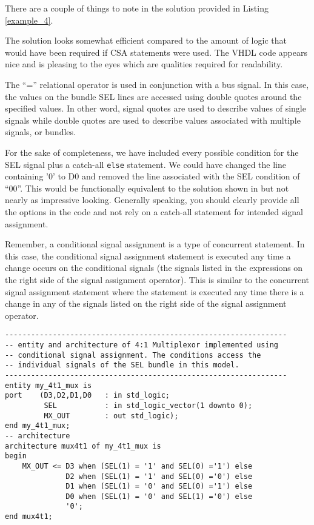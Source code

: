 There are a couple of things to note in the solution provided in Listing \ref{example_4}.
\begin{my_list}
\item The solution looks somewhat efficient compared to the amount of logic that would have been required if CSA statements were used. The VHDL code appears nice and is pleasing to the eyes which are qualities required for readability.
\item The ``='' relational operator is used in conjunction with a bus signal. In this case, the values on the bundle SEL lines are accessed using double quotes around the specified values. In other word, signal quotes are used to describe values of single signals while double quotes are used to describe values associated with multiple signals, or bundles.
\item For the sake of completeness, we have included every possible condition for the SEL signal plus a catch-all \texttt{else} statement. We could have changed the line containing '0' to D0 and removed the line associated with the SEL condition of ``00''. This would be functionally equivalent to the solution shown in but not nearly as impressive looking. Generally speaking, you should clearly provide all the options in the code and not rely on a catch-all statement for intended signal assignment.
\end{my_list}
Remember, a conditional signal assignment is a type of concurrent statement. In this case, the conditional signal assignment statement is executed any time a change occurs on the conditional signals (the signals listed in the expressions on the right side of the signal assignment operator). This is similar to the concurrent signal assignment statement where the statement is executed any time there is a change in any of the signals listed on the right side of the signal assignment operator.

\begin{lstlisting}[label=example_4_bis, caption=Alternative solution to example 4 accessing individual signals.]
-----------------------------------------------------------------
-- entity and architecture of 4:1 Multiplexor implemented using
-- conditional signal assignment. The conditions access the
-- individual signals of the SEL bundle in this model.
-----------------------------------------------------------------
entity my_4t1_mux is
port	(D3,D2,D1,D0   : in std_logic;
         SEL           : in std_logic_vector(1 downto 0);
         MX_OUT        : out std_logic);
end my_4t1_mux;
-- architecture
architecture mux4t1 of my_4t1_mux is
begin
	MX_OUT <= D3 when (SEL(1) = '1' and SEL(0) ='1') else
	          D2 when (SEL(1) = '1' and SEL(0) ='0') else
	          D1 when (SEL(1) = '0' and SEL(0) ='1') else
	          D0 when (SEL(1) = '0' and SEL(1) ='0') else
	          '0';
end mux4t1;
\end{lstlisting}

